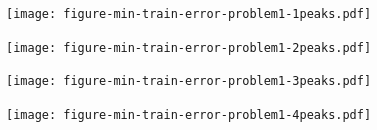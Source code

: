 \documentclass{beamer}
\begin{document}
\begin{frame}
  \texttt{[image: figure-min-train-error-problem1-1peaks.pdf]}
\end{frame}

\begin{frame}
  \texttt{[image: figure-min-train-error-problem1-2peaks.pdf]}
\end{frame}

\begin{frame}
  \texttt{[image: figure-min-train-error-problem1-3peaks.pdf]}
\end{frame}

\begin{frame}
  \texttt{[image: figure-min-train-error-problem1-4peaks.pdf]}
\end{frame}
\end{document}
